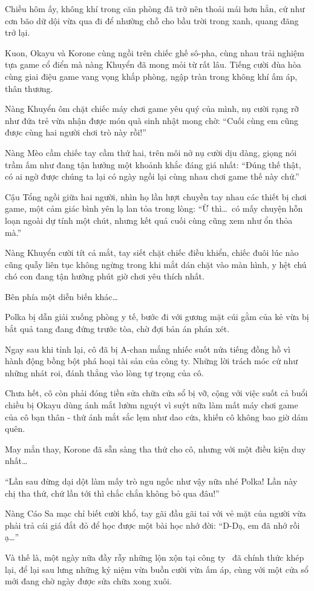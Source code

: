 \documentclass[../main.tex]{subfiles}
\begin{document}
\ct

Chiều hôm ấy, không khí trong căn phòng đã trở nên thoải mái hơn hẳn, cứ như cơn bão dữ dội vừa qua đi để nhường chỗ cho bầu trời trong xanh, quang đãng trở lại.

Kuon, Okayu và Korone cùng ngồi trên chiếc ghế sô-pha, cùng nhau trải nghiệm tựa game cổ điển mà nàng Khuyển đã mong mỏi từ rất lâu. Tiếng cười đùa hòa cùng giai điệu game vang vọng khắp phòng, ngập tràn trong không khí ấm áp, thân thương.

Nàng Khuyển ôm chặt chiếc máy chơi game yêu quý của mình, nụ cười rạng rỡ như đứa trẻ vừa nhận được món quà sinh nhật mong chờ: ``Cuối cùng em cũng được cùng hai người chơi trò này rồi!''

Nàng Mèo cầm chiếc tay cầm thứ hai, trên môi nở nụ cười dịu dàng, giọng nói trầm ấm như đang tận hưởng một khoảnh khắc đáng giá nhất: ``Đúng thế thật, có ai ngờ được chúng ta lại có ngày ngồi lại cùng nhau chơi game thế này chứ.''

Cậu Tổng ngồi giữa hai người, nhìn họ lần lượt chuyền tay nhau các thiết bị chơi game, một cảm giác bình yên lạ lan tỏa trong lòng: ``Ừ thì\dots\ có mấy chuyện hỗn loạn ngoài dự tính một chút, nhưng kết quả cuối cùng cũng xem như ổn thỏa mà.''

Nàng Khuyển cười tít cả mắt, tay siết chặt chiếc điều khiển, chiếc đuôi lúc nào cũng quẫy liên tục không ngừng trong khi mắt dán chặt vào màn hình, y hệt chú chó con đang tận hưởng phút giờ chơi yêu thích nhất.

Bên phía một diễn biến khác\dots

Polka bị dẫn giải xuống phòng y tế, bước đi với gương mặt cúi gằm của kẻ vừa bị bắt quả tang đang đứng trước tòa, chờ đợi bản án phán xét.

Ngay sau khi tỉnh lại, cô đã bị A-chan mắng nhiếc suốt nửa tiếng đồng hồ vì hành động bồng bột phá hoại tài sản của công ty. Những lời trách móc cứ như những nhát roi, đánh thẳng vào lòng tự trọng của cô.

Chưa hết, cô còn phải đóng tiền sửa chữa cửa sổ bị vỡ, cộng với việc suốt cả buổi chiều bị Okayu dùng ánh mắt lườm nguýt vì suýt nữa làm mất máy chơi game của cô bạn thân - thứ ánh mắt sắc lẹm như dao cứa, khiến cô không bao giờ dám quên.

May mắn thay, Korone đã sẵn sàng tha thứ cho cô, nhưng với một điều kiện duy nhất\dots

``Lần sau đừng dại dột làm mấy trò ngu ngốc như vậy nữa nhé Polka! Lần này chị tha thứ, chứ lần tới thì chắc chắn không bỏ qua đâu!''

Nàng Cáo Sa mạc chỉ biết cười khổ, tay gãi đầu gãi tai với vẻ mặt của người vừa phải trả cái giá đắt đỏ để học được một bài học nhớ đời: ``D-Dạ, em đã nhớ rồi ạ\dots''

Và thế là, một ngày nữa đầy rẫy những lộn xộn tại công ty \hll\ đã chính thức khép lại, để lại sau lưng những kỷ niệm vừa buồn cười vừa ấm áp, cùng với một cửa sổ mới đang chờ ngày được sửa chữa xong xuôi.
\end{document}
